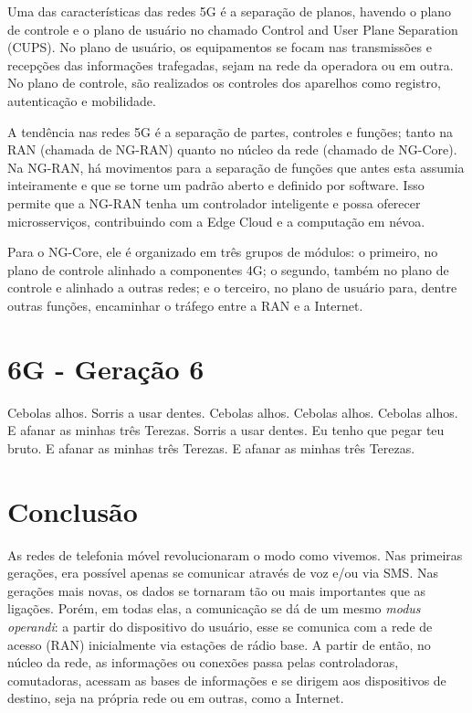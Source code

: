 \documentclass[11pt,oneside,a4paper]{abntex2}
\begin{document}
Uma das características das redes 5G é a separação de planos, havendo o plano de controle e o plano de usuário no chamado Control and User Plane Separation (CUPS). No plano de usuário, os equipamentos se focam nas transmissões e recepções das informações trafegadas, sejam na rede da operadora ou em outra. No plano de controle, são realizados os controles dos aparelhos como registro, autenticação e mobilidade.

A tendência nas redes 5G é a separação de partes, controles e funções; tanto na RAN (chamada de NG-RAN) quanto no núcleo da rede (chamado de NG-Core). Na NG-RAN, há movimentos para a separação de funções que antes esta assumia inteiramente e que se torne um padrão aberto e definido por software. Isso permite que a NG-RAN tenha um controlador inteligente e possa oferecer microsserviços, contribuindo com a Edge Cloud e a computação em névoa.

Para o NG-Core, ele é organizado em três grupos de módulos: o primeiro, no plano de controle alinhado a componentes 4G; o segundo, também no plano de controle e alinhado a outras redes; e o terceiro, no plano de usuário para, dentre outras funções, encaminhar o tráfego entre a RAN e a Internet.

\section*{6G - Geração 6}
\label{6g}

Cebolas alhos. Sorris a usar dentes. Cebolas alhos. Cebolas alhos. Cebolas alhos. E afanar as minhas três Terezas. Sorris a usar dentes. Eu tenho que pegar teu bruto. E afanar as minhas três Terezas. E afanar as minhas três Terezas.

\section*{Conclusão}
\label{conclusao}

As redes de telefonia móvel revolucionaram o modo como vivemos. Nas primeiras gerações, era possível apenas se comunicar através de voz e/ou via SMS. Nas gerações mais novas, os dados se tornaram tão ou mais importantes que as ligações. Porém, em todas elas, a comunicação se dá de um mesmo \textit{modus operandi}: a partir do dispositivo do usuário, esse se comunica com a rede de acesso (RAN) inicialmente via estações de rádio base. A partir de então, no núcleo da rede, as informações ou conexões passa pelas controladoras, comutadoras, acessam as bases de informações e se dirigem aos dispositivos de destino, seja na própria rede ou em outras, como a Internet.
\end{document}
